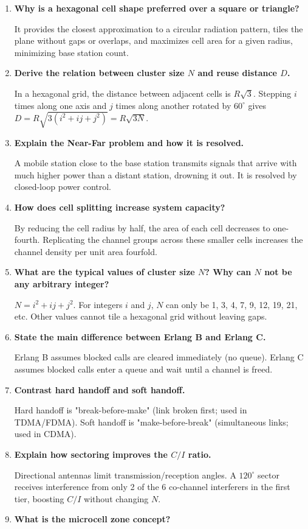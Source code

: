 \documentclass[12pt,a4paper]{article}
\newcommand{\Q}[1]{\textbf{#1}\par\noindent\ignorespaces}
\begin{document}
\begin{tcolorbox}[exambox, title={\textbf{Frequently Asked / Viva Questions}}]
\begin{enumerate}[topsep=0pt, label=\textbf{Q\arabic*.}, itemsep=5pt]
  \item \Q{Why is a hexagonal cell shape preferred over a square or triangle?}
    It provides the closest approximation to a circular radiation pattern, tiles the plane without gaps or overlaps, and maximizes cell area for a given radius, minimizing base station count.
  \item \Q{Derive the relation between cluster size $N$ and reuse distance $D$.}
    In a hexagonal grid, the distance between adjacent cells is $R\sqrt{3}$. Stepping $i$ times along one axis and $j$ times along another rotated by $60^\circ$ gives $D = R\sqrt{3(i^2 + ij + j^2)} = R\sqrt{3N}$.
  \item \Q{Explain the Near-Far problem and how it is resolved.}
    A mobile station close to the base station transmits signals that arrive with much higher power than a distant station, drowning it out. It is resolved by closed-loop power control.
  \item \Q{How does cell splitting increase system capacity?}
    By reducing the cell radius by half, the area of each cell decreases to one-fourth. Replicating the channel groups across these smaller cells increases the channel density per unit area fourfold.
  \item \Q{What are the typical values of cluster size $N$? Why can $N$ not be any arbitrary integer?}
    $N = i^2 + ij + j^2$. For integers $i$ and $j$, $N$ can only be 1, 3, 4, 7, 9, 12, 19, 21, etc. Other values cannot tile a hexagonal grid without leaving gaps.
  \item \Q{State the main difference between Erlang B and Erlang C.}
    Erlang B assumes blocked calls are cleared immediately (no queue). Erlang C assumes blocked calls enter a queue and wait until a channel is freed.
  \item \Q{Contrast hard handoff and soft handoff.}
    Hard handoff is "break-before-make" (link broken first; used in TDMA/FDMA). Soft handoff is "make-before-break" (simultaneous links; used in CDMA).
  \item \Q{Explain how sectoring improves the $C/I$ ratio.}
    Directional antennas limit transmission/reception angles. A $120^\circ$ sector receives interference from only 2 of the 6 co-channel interferers in the first tier, boosting $C/I$ without changing $N$.
  \item \Q{What is the microcell zone concept?}

\end{enumerate}
\end{tcolorbox}
\end{document}
